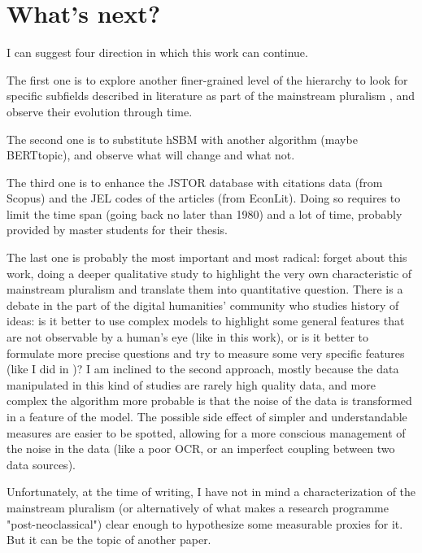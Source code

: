 \documentclass[a4paper, 11pt, headings=standardclasses, tablecaptionsbelow]{scrartcl}
\begin{document}
\section{What's next?}
I can suggest four direction in which this work can continue.

The first one is to explore another finer-grained level of the hierarchy to look for specific subfields described in literature as part of the mainstream pluralism \parencite[§1]{davis2006}, and observe their evolution through time.

The second one is to substitute hSBM with another algorithm (maybe BERTtopic), and observe what will change and what not.

The third one is to enhance the JSTOR database with citations data (from Scopus) and the JEL codes of the articles (from EconLit). Doing so requires to limit the time span (going back no later than 1980) and a lot of time, probably provided by master students for their thesis.

The last one is probably the most important and most radical: forget about this work, doing a deeper qualitative study to highlight the very own characteristic of mainstream pluralism and translate them into quantitative question.
There is a debate in the part of the digital humanities' community who studies history of ideas: is it better to use complex models to highlight some general features that are not observable by a human's eye (like in this work), or is it better to formulate more precise questions and try to measure some very specific features (like I did in \textcite{babbiotti2022})?
I am inclined to the second approach, mostly because the data manipulated in this kind of studies are rarely high quality data, and more complex the algorithm more probable is that the noise of the data is transformed in a feature of the model. The possible side effect of simpler and understandable measures are easier to be spotted, allowing for a more conscious management of the noise in the data (like a poor OCR, or an imperfect coupling between two data sources).

Unfortunately, at the time of writing, I have not in mind a characterization of the mainstream pluralism (or alternatively of what makes a research programme "post-neoclassical") clear enough to hypothesize some measurable proxies for it. But it can be the topic of another paper.
\end{document}
